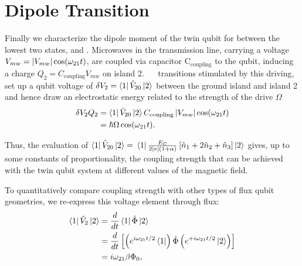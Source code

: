 \newpage
\section{Dipole Transition}
\label{sec:dipole-transition}

\noindent Finally we characterize  the dipole moment of the
twin qubit for between the  lowest two states,  and
.  Microwaves in the  transmission line, carrying a
voltage  $  V_{mw}=   \left|V_{mw}\right|\cos(\omega_{21  }t)  $,  are
coupled via  capacitor C$_{\text{coupling}}$ to  the qubit,
inducing  a charge  $ Q_{2}=C_{\text{coupling}}V_{mw}  $ on
island 2. ~\ilra~ transitions stimulated by
this    driving,    set    up   a    qubit    voltage    of
$ \delta V_2 = \Bra{1}\hat{V}_{20}\Ket{2} $ between the ground
island and island 2 and  hence draw an electrostatic energy
related to the strength of the drive $\Omega$
\begin{equation}
  \label{eq:dipoleEnergy}
  \begin{aligned}
    \delta V_{2}Q_{2} & = \Bra{1}\hat{V}_{20}\Ket{2} C_{\text{coupling}}\left|V_{mw}\right|\cos(\omega_{21}  t) \\
    & = \hbar\Omega\cos(\omega_{21}t).
  \end{aligned}
\end{equation}

\noindent        Thus,       the        evaluation       of
$         \Bra{1}\hat{V}_{20}\Ket{2}          =         $
$  \Bra{1}\frac{E_{C}}{2  \left|e\right|(1+\alpha)}\left[\hat{n}_1  +
  2\hat{n}_2 +\hat{n}_3\right]\Ket{2}$  gives, up  to some
constants  of proportionality,  the coupling  strength that
can be  achieved with  the twin  qubit system  at different
values of the magnetic field.

To  quantitatively  compare  coupling strength  with  other
types of flux qubit  geometries, we re-express this voltage
element through flux:
\begin{equation}
  \label{eq:dipole_voltage_7}
  \begin{aligned}
    \Bra{1}\hat{V}_2 \Ket{2} & =  \frac{d}{dt}\Bra{1}\hat{\Phi}\Ket{2}\\
    & = \frac{d}{dt}\left[\left(e^{i\omega_{21}t/2}\Bra{1}\right) \hat{\Phi}\left(e^{+i\omega_{21}t/2}\Ket{2}\right)\right]\\
    & = {i\omega_{21}\beta\Phi_0},
  \end{aligned}
\end{equation}

